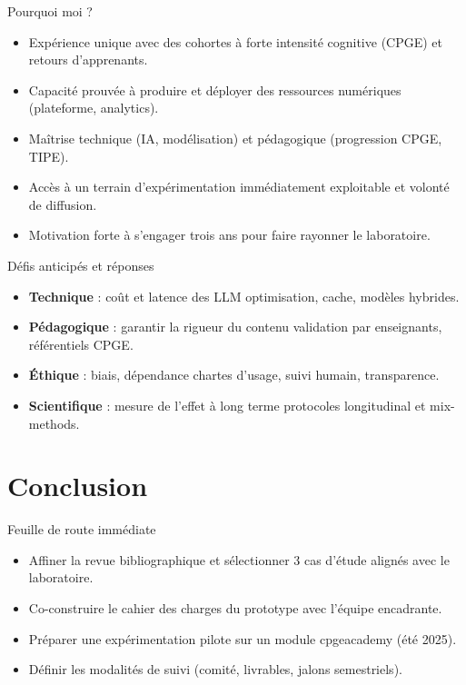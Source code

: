 \documentclass[aspectratio=169]{beamer}
\begin{document}
\begin{frame}{Pourquoi moi ?}
  \begin{itemize}
    \item Expérience unique avec des cohortes à forte intensité cognitive (CPGE) et retours d'apprenants.
    \item Capacité prouvée à produire et déployer des ressources numériques (plateforme, analytics).
    \item Maîtrise technique (IA, modélisation) et pédagogique (progression CPGE, TIPE).
    \item Accès à un terrain d'expérimentation immédiatement exploitable et volonté de diffusion.
    \item Motivation forte à s'engager trois ans pour faire rayonner le laboratoire.
  \end{itemize}
\end{frame}

\begin{frame}{Défis anticipés et réponses}
  \begin{itemize}
    \item \textbf{Technique} : coût et latence des LLM \textrightarrow{} optimisation, cache, modèles hybrides.
    \item \textbf{Pédagogique} : garantir la rigueur du contenu \textrightarrow{} validation par enseignants, référentiels CPGE.
    \item \textbf{Éthique} : biais, dépendance \textrightarrow{} chartes d'usage, suivi humain, transparence.
    \item \textbf{Scientifique} : mesure de l'effet à long terme \textrightarrow{} protocoles longitudinal et mix-methods.
  \end{itemize}
\end{frame}

\section{Conclusion}

\begin{frame}{Feuille de route immédiate}
  \begin{itemize}
    \item Affiner la revue bibliographique et sélectionner 3 cas d'étude alignés avec le laboratoire.
    \item Co-construire le cahier des charges du prototype avec l'équipe encadrante.
    \item Préparer une expérimentation pilote sur un module cpgeacademy (été 2025).
    \item Définir les modalités de suivi (comité, livrables, jalons semestriels).
  \end{itemize}
\end{frame}
\end{document}
